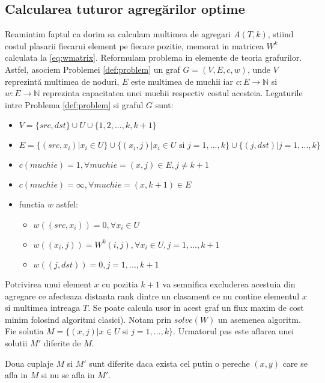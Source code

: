 \subsection{Calcularea tuturor agregărilor optime}
Reamintim faptul ca dorim sa calculam multimea de agregari $A(T, k)$, stiind costul plasarii 
fiecarui element pe fiecare pozitie, memorat in matricea $W^k$ calculata la \eqref{eq:wmatrix}. 
Reformulam problema in elemente de teoria grafurilor. Astfel, asociem Problemei \ref{def:problem} 
un graf $G = (V, E, c, w)$, unde $V$ reprezintă multimea de noduri, $E$ este multimea de muchii iar
$c \colon E \to \mathbb{N}$ si $w \colon E \to \mathbb{N}$ reprezinta capacitatea unei muchii
respectiv costul acesteia. Legaturile intre Problema \ref{def:problem} si graful $G$ sunt:
\begin{itemize}
  \item $V = \{src, dst\} \cup U \cup \{1, 2,..., k, k+1\}$
  \item $E = \{(src, x_i) | x_i \in U\} \cup \{(x_i, j) | x_i \in U \text{ si } j = 1,...,k\} \cup 
    \{(j, dst) | j = 1,...,k\}$  
  \item $c(muchie) = 1, \forall muchie = (x, j) \in E, j \neq k+1$
  \item $c(muchie) = \infty, \forall muchie = (x, k+1) \in E$
  \item functia $w$ astfel:
  \begin{itemize}
    \item $w((src, x_i)) = 0, \forall x_i \in U$
    \item $w((x_i, j)) = W^k(i, j), \forall x_i \in U, j = 1,...,k+1$
    \item $w((j, dst)) = 0, j = 1,...,k+1$
  \end{itemize}
\end{itemize}

Potrivirea unui element $x$ cu pozitia $k+1$ va semnifica excluderea acestuia din agregare ce 
afecteaza distanta rank dintre un clasament ce nu contine elementul $x$ si multimea intreaga $T$.
Se poate calcula usor in acest graf un flux maxim de cost minim folosind algoritmi clasici\cite{flowassignment}).
Notam prin $solve(W)$ un asemenea algoritm.
Fie solutia $M = \{(x, j) | x \in U \text{ si } j = 1,...,k\}$. Urmatorul pas este aflarea unei
solutii $M'$ diferite de $M$.

\begin{proposition}
Doua cuplaje $M$ si $M'$ sunt diferite daca exista cel putin o pereche $(x, y)$ care se afla in $M$
si nu se afla in $M'$.
\end{proposition}

